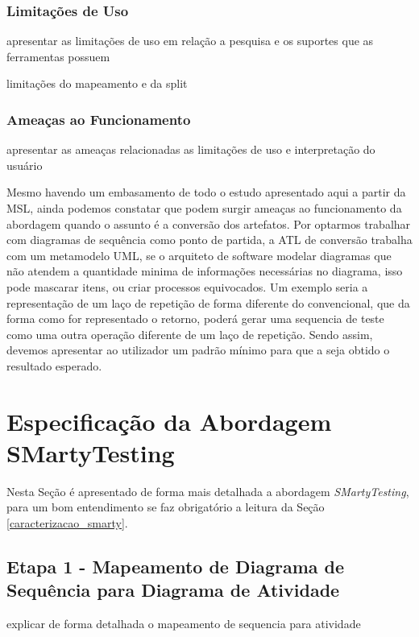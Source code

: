 \subsubsection{Limitações de Uso}

apresentar as limitações de uso em relação a pesquisa e os suportes que as ferramentas possuem

limitações do mapeamento e da split

\subsubsection{Ameaças ao Funcionamento}

apresentar as ameaças relacionadas as limitações de uso e interpretação do usuário

Mesmo havendo um embasamento de todo o estudo apresentado aqui a partir da MSL, ainda podemos constatar que podem surgir ameaças ao funcionamento da abordagem quando o assunto é a conversão dos artefatos. Por optarmos trabalhar com diagramas de sequência como ponto de partida, a ATL de conversão trabalha com um metamodelo UML, se o arquiteto de software modelar diagramas que não atendem a quantidade minima de informações necessárias no diagrama, isso pode mascarar itens, ou criar processos equivocados. Um exemplo seria a representação de um laço de repetição de forma diferente do convencional, que da forma como for representado o retorno, poderá gerar uma sequencia de teste como uma outra operação diferente de um laço de repetição. Sendo assim, devemos apresentar ao utilizador um padrão mínimo para que a seja obtido o resultado esperado.


\section{Especificação da Abordagem SMartyTesting}
\label{especificacao_smarty}
Nesta Seção é apresentado de forma mais detalhada a abordagem \textit{SMartyTesting}, para um bom entendimento se faz obrigatório a leitura da Seção \ref{caracterizacao_smarty}.

\subsection{Etapa 1 - Mapeamento de Diagrama de Sequência para Diagrama de Atividade}

explicar de forma detalhada o mapeamento de sequencia para atividade





